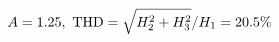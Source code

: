 \documentclass[preview]{standalone}
\begin{document}
\begin{align*}
\special{dvisvgm:raw <g id='unique000'>}A=1.25,\ \text{THD}=\sqrt{H_2^2+H_3^2}/H_1=20.5\%\special{dvisvgm:raw </g>}
\end{align*}
\end{document}
